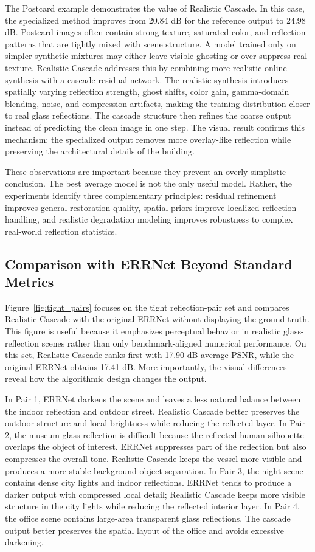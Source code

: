 The Postcard example demonstrates the value of Realistic Cascade. In this case, the specialized method improves from 20.84 dB for the reference output to 24.98 dB. Postcard images often contain strong texture, saturated color, and reflection patterns that are tightly mixed with scene structure. A model trained only on simpler synthetic mixtures may either leave visible ghosting or over-suppress real texture. Realistic Cascade addresses this by combining more realistic online synthesis with a cascade residual network. The realistic synthesis introduces spatially varying reflection strength, ghost shifts, color gain, gamma-domain blending, noise, and compression artifacts, making the training distribution closer to real glass reflections. The cascade structure then refines the coarse output instead of predicting the clean image in one step. The visual result confirms this mechanism: the specialized output removes more overlay-like reflection while preserving the architectural details of the building.

These observations are important because they prevent an overly simplistic conclusion. The best average model is not the only useful model. Rather, the experiments identify three complementary principles: residual refinement improves general restoration quality, spatial priors improve localized reflection handling, and realistic degradation modeling improves robustness to complex real-world reflection statistics.

\subsection{Comparison with ERRNet Beyond Standard Metrics}

Figure~\ref{fig:tight_pairs} focuses on the tight reflection-pair set and compares Realistic Cascade with the original ERRNet without displaying the ground truth. This figure is useful because it emphasizes perceptual behavior in realistic glass-reflection scenes rather than only benchmark-aligned numerical performance. On this set, Realistic Cascade ranks first with 17.90 dB average PSNR, while the original ERRNet obtains 17.41 dB. More importantly, the visual differences reveal how the algorithmic design changes the output.

In Pair 1, ERRNet darkens the scene and leaves a less natural balance between the indoor reflection and outdoor street. Realistic Cascade better preserves the outdoor structure and local brightness while reducing the reflected layer. In Pair 2, the museum glass reflection is difficult because the reflected human silhouette overlaps the object of interest. ERRNet suppresses part of the reflection but also compresses the overall tone. Realistic Cascade keeps the vessel more visible and produces a more stable background-object separation. In Pair 3, the night scene contains dense city lights and indoor reflections. ERRNet tends to produce a darker output with compressed local detail; Realistic Cascade keeps more visible structure in the city lights while reducing the reflected interior layer. In Pair 4, the office scene contains large-area transparent glass reflections. The cascade output better preserves the spatial layout of the office and avoids excessive darkening.

